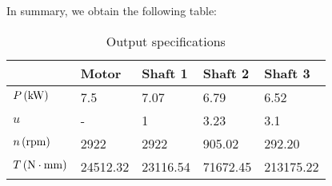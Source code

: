 In summary, we obtain the following table:
\begin{table}[ht]
	\centering
	\begin{tabular}{lllll}
		&Motor    & Shaft 1  & Shaft 2  & Shaft 3   \\\toprule
		$ P \, (\mathrm{kW})$ & 7.5  & 7.07& 6.79   & 6.52   \\
		$ u $ &       -   &1    &  3.23  & 3.1                 \\
		$ n \, (\mathrm{rpm})$ & 2922 & 2922 & 905.02 & 292.20 \\
		$ T \, (\mathrm{N\cdot mm})$ & 24512.32 & 23116.54 & 71672.45 & 213175.22
	\end{tabular}
	\caption{Output specifications}
	\label{tab:my-table}
\end{table}


